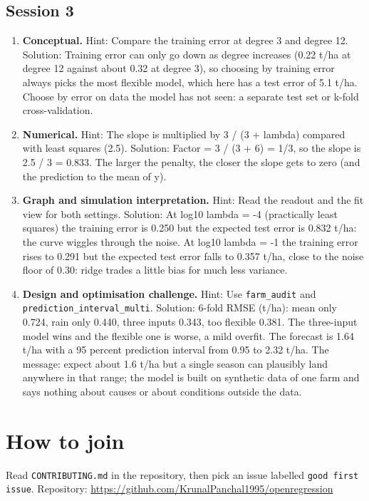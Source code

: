 \documentclass[11pt,a4paper]{article}
\begin{document}
\subsection*{Session 3}
\begin{enumerate}[nosep]
\item \textbf{Conceptual.} Hint: Compare the training error at degree 3 and degree 12. Solution: Training error can only go down as degree increases (0.22 t/ha at degree 12 against about 0.32 at degree 3), so choosing by training error always picks the most flexible model, which here has a test error of 5.1 t/ha. Choose by error on data the model has not seen: a separate test set or k-fold cross-validation.
\item \textbf{Numerical.} Hint: The slope is multiplied by 3 / (3 + lambda) compared with least squares (2.5). Solution: Factor = 3 / (3 + 6) = 1/3, so the slope is 2.5 / 3 = 0.833. The larger the penalty, the closer the slope gets to zero (and the prediction to the mean of y).
\item \textbf{Graph and simulation interpretation.} Hint: Read the readout and the fit view for both settings. Solution: At log10 lambda = -4 (practically least squares) the training error is 0.250 but the expected test error is 0.832 t/ha: the curve wiggles through the noise. At log10 lambda = -1 the training error rises to 0.291 but the expected test error falls to 0.357 t/ha, close to the noise floor of 0.30: ridge trades a little bias for much less variance.
\item \textbf{Design and optimisation challenge.} Hint: Use \texttt{farm\_audit} and \texttt{prediction\_interval\_multi}. Solution: 6-fold RMSE (t/ha): mean only 0.724, rain only 0.440, three inputs 0.343, too flexible 0.381. The three-input model wins and the flexible one is worse, a mild overfit. The forecast is 1.64 t/ha with a 95 percent prediction interval from 0.95 to 2.32 t/ha. The message: expect about 1.6 t/ha but a single season can plausibly land anywhere in that range; the model is built on synthetic data of one farm and says nothing about causes or about conditions outside the data.
\end{enumerate}

\section{How to join}
Read \texttt{CONTRIBUTING.md} in the repository, then pick an issue labelled \texttt{good first issue}. Repository: \url{https://github.com/KrunalPanchal1995/openregression}
\end{document}
